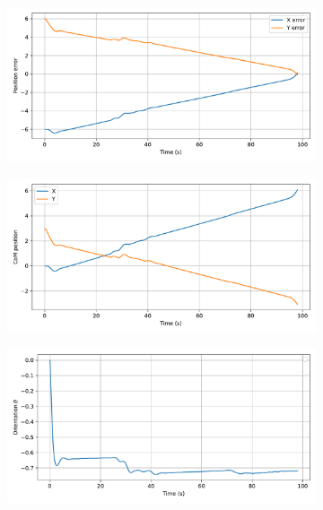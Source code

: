 \begin{figure}[H]
    \centering
    \begin{subfigure}{0.45\linewidth}
        \centering
        \includegraphics[width=\linewidth]{figures/Simulations/sim1circles_delta/evolution_0.pdf}
    \end{subfigure}
    \begin{subfigure}{0.45\linewidth}
        \centering
        \includegraphics[width=\linewidth]{figures/Simulations/sim1circles_delta/evolution_4.pdf}
    \end{subfigure}
    \hfill
    \begin{subfigure}{0.45\linewidth}
        \centering
        \includegraphics[width=\linewidth]{figures/Simulations/sim1circles_delta/evolution_2.pdf}

\end{subfigure}
\end{figure}
